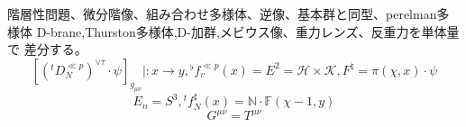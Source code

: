 \documentclass{jsarticle}
\begin{document}
\title{}
\author{}
\date{}
\maketitle
  
  階層性問題、微分階像、組み合わせ多様体、逆像、基本群と同型、perelman多様体
  D-brane,Thurston多様体,D-加群,メビウス像、重力レンズ、反重力を単体量で
  差分する。
  $$ \left[ \left({}^t D_N^{\ll p}\right)^{\vee \tau} \cdot \psi \right]_{g_{
	  \mu\nu}}|: x \to y, {}^{\flat} f_v^{\ll p}(x) = E^2 = \mathcal{H}
  \times \mathcal{K}, F^{\natural} = \pi(\chi,x)\cdot \psi $$
  $$ E_n = S^3, {}^t f_N^{\sharp}(x) = \mathbb{N} \cdot \mathbb{F}
  (\chi - 1,y) $$
  $$ G^{\mu\nu} = T^{\mu\nu} $$
\end{document}
